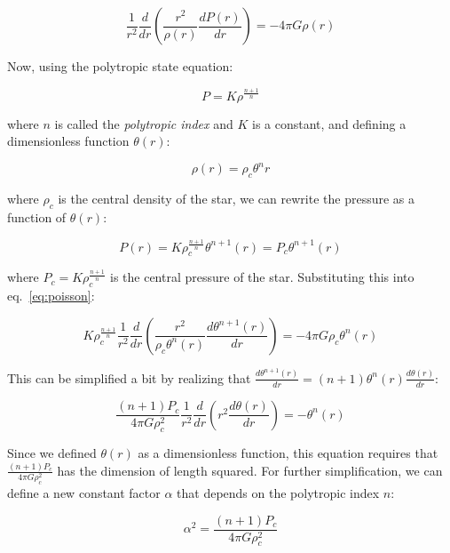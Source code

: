 \documentclass[twoside]{article}
\begin{document}
\begin{equation}
    \label{eq:poisson}
    \frac{1}{r^2} \frac{d}{dr} \left( \frac{r^2}{\rho(r)}\frac{dP(r)}{dr} \right) = -4 \pi G\rho(r)
\end{equation}

Now, using the polytropic state equation:

\begin{equation}
    \label{eq:polytropstate}
    P=K\rho^{\frac{n+1}{n}}
\end{equation}

where \(n\) is called the \textit{polytropic index} and \(K\) is a constant, and
defining a dimensionless function \(\theta(r)\):

\begin{equation}
    \label{eq:thetar}
    \rho(r)=\rho_c\theta^n{r}
\end{equation}

where \(\rho_c\) is the central density of the star, we can rewrite the pressure
as a function of \(\theta(r)\):

            \[
                P(r)=K\rho_c^{\frac{n+1}{n}}\theta^{n+1}(r)=P_c\theta^{n+1}(r)
            \]

            where \(P_c=K\rho_c^{\frac{n+1}{n}}\) is the central pressure of the
            star. Substituting this into eq.~\ref{eq:poisson}:

            \[
                K\rho_c^{\frac{n+1}{n}}\frac{1}{r^2}\frac{d}{dr}\left(\frac{r^2}{\rho_c\theta^n(r)}\frac{d\theta^{n+1}(r)}{dr}\right)=-4\pi
                G\rho_c\theta^n(r)
            \]

            This can be simplified a bit by realizing that
            \(\frac{d\theta^{n+1}(r)}{dr}=(n+1)\theta^n(r)\frac{d\theta(r)}{dr}\):

            \begin{equation}
                \label{eq:simplpois}
                \frac{(n+1)P_c}{4\pi
                G\rho_c^2}\frac{1}{r^2}\frac{d}{dr}\left(r^2\frac{d\theta(r)}{dr}\right)=-\theta^n(r)
            \end{equation}

            Since we defined \(\theta(r)\) as a dimensionless function, this
            equation requires that \(\frac{(n+1)P_c}{4\pi G\rho_c^2}\) has the
            dimension of length squared. For further simplification, we can
            define a new constant factor \(\alpha\) that depends on the
            polytropic index \(n\):

            \begin{equation}
                \label{eq:alpha}
                \alpha^2=\frac{(n+1)P_c}{4\pi G\rho_c^2}
            \end{equation}
\end{document}
